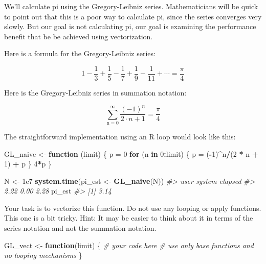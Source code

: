 \documentclass[]{book}
\newenvironment{Shaded}{\begin{snugshade}}{\end{snugshade}}
\newcommand{\KeywordTok}[1]{\textcolor[rgb]{0.13,0.29,0.53}{\textbf{#1}}}
\newcommand{\DecValTok}[1]{\textcolor[rgb]{0.00,0.00,0.81}{#1}}
\newcommand{\FloatTok}[1]{\textcolor[rgb]{0.00,0.00,0.81}{#1}}
\newcommand{\StringTok}[1]{\textcolor[rgb]{0.31,0.60,0.02}{#1}}
\newcommand{\CommentTok}[1]{\textcolor[rgb]{0.56,0.35,0.01}{\textit{#1}}}
\newcommand{\ControlFlowTok}[1]{\textcolor[rgb]{0.13,0.29,0.53}{\textbf{#1}}}
\newcommand{\OperatorTok}[1]{\textcolor[rgb]{0.81,0.36,0.00}{\textbf{#1}}}
\newcommand{\NormalTok}[1]{#1}
\theoremstyle{definition}
\theoremstyle{definition}
\theoremstyle{definition}
\theoremstyle{remark}
\begin{document}
We'll calculate pi using the Gregory-Leibniz series. Mathematicians will
be quick to point out that this is a poor way to calculate pi, since the
series converges very slowly. But our goal is not calculating pi, our
goal is examining the performance benefit that be be achieved using
vectorization.

Here is a formula for the Gregory-Leibniz series:

\begin{equation}
1 - \frac{1}{3} + \frac{1}{5} - \frac{1}{7} + \frac{1}{9} - \frac{1}{11} + \cdots = \frac{\pi}{4}
\end{equation}

Here is the Gregory-Leibniz series in summation notation:

\begin{equation}
\sum_{\text{n}=0}^{\infty} \frac{(-1)^n}{2\cdot n + 1} = \frac{\pi}{4}
\end{equation}

The straightforward implementation using an R loop would look like this:

\begin{Shaded}
\begin{Highlighting}[]
\NormalTok{GL_naive <-}\StringTok{ }\ControlFlowTok{function}\NormalTok{ (limit) \{}
\NormalTok{  p =}\StringTok{ }\DecValTok{0}
  \ControlFlowTok{for}\NormalTok{ (n }\ControlFlowTok{in} \DecValTok{0}\OperatorTok{:}\NormalTok{limit) \{}
\NormalTok{    p =}\StringTok{ }\NormalTok{(}\OperatorTok{-}\DecValTok{1}\NormalTok{)}\OperatorTok{^}\NormalTok{n}\OperatorTok{/}\NormalTok{(}\DecValTok{2} \OperatorTok{*}\StringTok{ }\NormalTok{n }\OperatorTok{+}\StringTok{ }\DecValTok{1}\NormalTok{) }\OperatorTok{+}\StringTok{ }\NormalTok{p}
\NormalTok{    \}}
  \DecValTok{4}\OperatorTok{*}\NormalTok{p}
\NormalTok{\}}

\NormalTok{N <-}\StringTok{ }\FloatTok{1e7}
\KeywordTok{system.time}\NormalTok{(pi_est <-}\StringTok{ }\KeywordTok{GL_naive}\NormalTok{(N))}
\CommentTok{#>    user  system elapsed }
\CommentTok{#>    2.22    0.00    2.28}
\NormalTok{pi_est}
\CommentTok{#> [1] 3.14}
\end{Highlighting}
\end{Shaded}

Your task is to vectorize this function. Do not use any looping or apply
functions. This one is a bit tricky. Hint: It may be easier to think
about it in terms of the series notation and not the summation notation.

\begin{Shaded}
\begin{Highlighting}[]
\NormalTok{GL_vect <-}\StringTok{ }\ControlFlowTok{function}\NormalTok{(limit) \{}
  \CommentTok{# your code here}
  \CommentTok{# use only base functions and no looping mechanisms}
\NormalTok{\}}
\end{Highlighting}
\end{Shaded}
\end{document}
